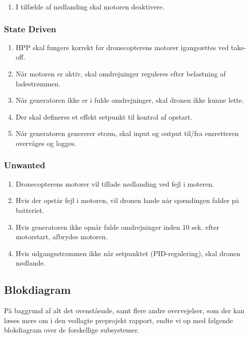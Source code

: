 \begin{enumerate}[label=2.1.2.\arabic*]
\item I tilfælde af nødlanding skal motoren deaktivere. 
\end{enumerate}

\subsubsection{State Driven}
\label{sec:kravspecifikation-3}

\begin{enumerate}[label=2.1.3.\arabic*]
\item HPP skal fungere korrekt før dronecopterens motorer igangsættes ved take-off.
\item Når motoren er aktiv, skal omdrejninger reguleres efter belastning af ladestrømmen.
\item Når generatoren ikke er i fulde omdrejninger, skal dronen ikke kunne lette.
\item Der skal defineres et effekt setpunkt til kontrol af opstart.
\item Når generatoren genererer strøm, skal input og output til/fra ensretteren overvåges og logges.
\end{enumerate}

\subsubsection{Unwanted}
\label{sec:kravspecifikation-4}

\begin{enumerate}[label=2.1.4.\arabic*]
\item Dronecopterens motorer vil tillade nødlanding ved fejl i moteren.
\item Hvis der opstår fejl i motoren, vil dronen lande når spændingen falder på batteriet.
\item Hvis generatoren ikke opnår fulde omdrejninger inden 10 sek. efter motorstart, afbrydes motoren.
\item Hvis udgangsstrømmen ikke når setpunktet (PID-regulering), skal dronen nødlande.
\end{enumerate}

\subsection{Blokdiagram}
\label{sec:blokdiagram-}

På baggrund af alt det ovenstående, samt flere andre overvejelser, som der kan læses mere om i den vedlagte preprojekt rapport, endte vi op med følgende blokdiagram over de forskellige subsystemer.

